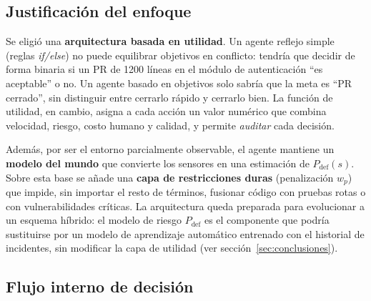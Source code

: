 \documentclass[11pt,a4paper]{article}
\newcommand{\Pdef}{P_{\text{def}}}
\begin{document}
\subsection{Justificación del enfoque}

Se eligió una \textbf{arquitectura basada en utilidad}. Un agente reflejo simple (reglas
\textit{if/else}) no puede equilibrar objetivos en conflicto: tendría que decidir de forma binaria si
un PR de 1200 líneas en el módulo de autenticación ``es aceptable'' o no. Un agente basado en
objetivos solo sabría que la meta es ``PR cerrado'', sin distinguir entre cerrarlo rápido y cerrarlo
bien. La función de utilidad, en cambio, asigna a cada acción un valor numérico que combina
velocidad, riesgo, costo humano y calidad, y permite \emph{auditar} cada decisión.

Además, por ser el entorno parcialmente observable, el agente mantiene un \textbf{modelo del mundo}
que convierte los sensores en una estimación de $\Pdef(s)$. Sobre esta base se añade una \textbf{capa
de restricciones duras} (penalización $w_p$) que impide, sin importar el resto de términos, fusionar
código con pruebas rotas o con vulnerabilidades críticas. La arquitectura queda preparada para
evolucionar a un esquema híbrido: el modelo de riesgo $\Pdef$ es el componente que podría sustituirse
por un modelo de aprendizaje automático entrenado con el historial de incidentes, sin modificar la
capa de utilidad (ver sección~\ref{sec:conclusiones}).

\subsection{Flujo interno de decisión}
\end{document}
